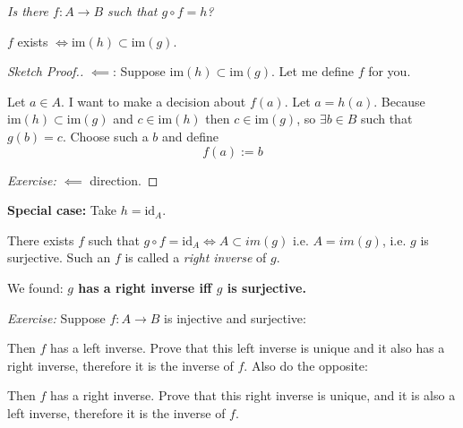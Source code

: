 \documentclass[10pt]{scrartcl}
\begin{document}
\emph{Is there $f:A \to B$ such that $g \circ f = h$?}\\

\begin{theorem}$f$ exists $\iff \mathrm{im}(h) \subset \mathrm{im}(g)$. \end{theorem}

\begin{proof}[Sketch Proof.] 
$\impliedby$: Suppose $\mathrm{im}(h) \subset \mathrm{im}(g)$. Let me define $f$ for you.

 Let $a \in A$. I want to make a decision about $f(a)$. Let $a = h(a)$. Because $\mathrm{im}(h) \subset \mathrm{im}(g)$ and $c \in \mathrm{im}(h)$ then $c \in \mathrm{im}(g)$, so $\exists b\in B$ such that $g(b) = c$. Choose such a $b$ and define \[f(a):= b\]

	
\emph{Exercise:} $\impliedby$ direction. 
\end{proof}

\textbf{Special case:} Take $h =\text{id}_A$. 

\begin{center}
\end{center}

There exists $f$ such that $g \circ f = \text{id}_A \iff A \subset im(g)$ i.e. $A = im(g)$, i.e. $g$ is surjective. Such an $f$ is called a \emph{right inverse} of $g$.

We found: \textbf{$g$ has a right inverse iff $g$ is surjective.}\vspace*{5pt}

\emph{Exercise:} Suppose $f: A \to B$ is injective and surjective:

 Then $f$ has a left inverse. Prove that this left inverse is unique and it also has a right inverse, therefore it is the inverse of $f$. Also do the opposite: 

Then $f$ has a right inverse. Prove that this right inverse is unique, and it is also a left inverse, therefore it is the inverse of $f$.\vspace*{5pt}
\end{document}
